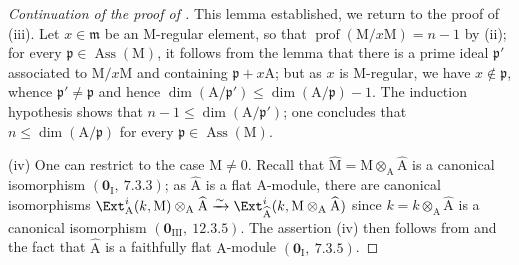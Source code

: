 \begin{proof}[Continuation of the proof of ]
This lemma established, we return to the proof of (iii).
Let $x\in\mathfrak{m}$ be an $\mathrm{M}$-regular element, so that $\operatorname{prof}(\mathrm{M}/x\mathrm{M})=n-1$ by (ii); for every $\mathfrak{p}\in\operatorname{Ass}(\mathrm{M})$, it follows from the lemma that there is a prime ideal $\mathfrak{p}'$ associated to $\mathrm{M}/x\mathrm{M}$ and containing $\mathfrak{p}+x\mathrm{A}$; but as $x$ is $\mathrm{M}$-regular, we have $x\notin\mathfrak{p}$, whence $\mathfrak{p}'\neq\mathfrak{p}$ and hence $\dim(\mathrm{A}/\mathfrak{p}')\leq\dim(\mathrm{A}/\mathfrak{p})-1$.
The induction hypothesis shows that $n-1\leq\dim(\mathrm{A}/\mathfrak{p}')$; one concludes that $n\leq\dim(\mathrm{A}/\mathfrak{p})$ for every $\mathfrak{p}\in\operatorname{Ass}(\mathrm{M})$.

(iv) One can restrict to the case $\mathrm{M}\neq 0$.
Recall that $\widehat{\mathrm{M}}=\mathrm{M}\otimes_\mathrm{A}\widehat{\mathrm{A}}$ is a canonical isomorphism $(\mathbf{0}_\mathrm{I},~7.3.3)$; as $\widehat{\mathrm{A}}$ is a flat $\mathrm{A}$-module, there are canonical isomorphisms $\Ext^i_\mathrm{A}(k,\mathrm{M})\otimes_\mathrm{A}\widehat{\mathrm{A}}\xrightarrow{\sim}\Ext^i_{\widehat{\mathrm{A}}}(k,\mathrm{M}\otimes_\mathrm{A}\widehat{\mathrm{A}})$ since $k=k\otimes_\mathrm{A}\widehat{\mathrm{A}}$ is a canonical isomorphism $(\mathbf{0}_\mathrm{III},~12.3.5)$.
The assertion (iv) then follows from  and the fact that $\widehat{\mathrm{A}}$ is a faithfully flat $\mathrm{A}$-module $(\mathbf{0}_\mathrm{I},~7.3.5)$.
\end{proof}

